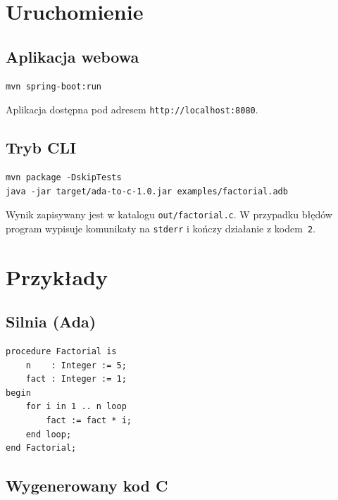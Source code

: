 \documentclass[12pt,a4paper]{article}
\begin{document}
\section{Uruchomienie}

\subsection{Aplikacja webowa}

\begin{lstlisting}[style=bnf]
mvn spring-boot:run
\end{lstlisting}

Aplikacja dostępna pod adresem \texttt{http://localhost:8080}.

\subsection{Tryb CLI}

\begin{lstlisting}[style=bnf]
mvn package -DskipTests
java -jar target/ada-to-c-1.0.jar examples/factorial.adb
\end{lstlisting}

Wynik zapisywany jest w katalogu \texttt{out/factorial.c}.
W przypadku błędów program wypisuje komunikaty na \texttt{stderr}
i kończy działanie z kodem~\texttt{2}.

\section{Przykłady}

\subsection{Silnia (Ada)}

\begin{lstlisting}[style=ada, caption={examples/factorial.adb}]
procedure Factorial is
    n    : Integer := 5;
    fact : Integer := 1;
begin
    for i in 1 .. n loop
        fact := fact * i;
    end loop;
end Factorial;
\end{lstlisting}

\subsection{Wygenerowany kod C}
\end{document}
